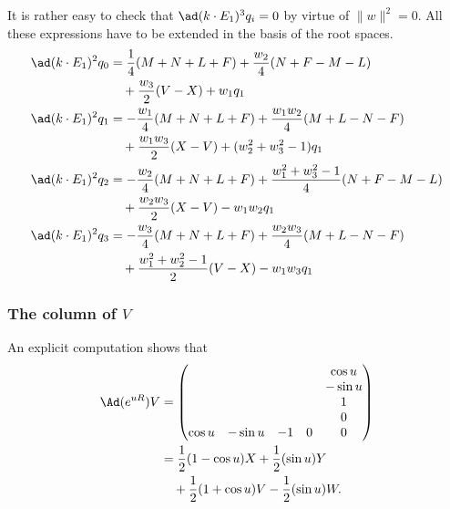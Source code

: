 It is rather easy to check that $\ad(k\cdot E_1)^3q_i=0$ by virtue of $\|w\|^2=0$. All these expressions have to be extended in the basis of the root spaces.
\begin{equation}
	\begin{split}
		\ad(k\cdot E_1)^2q_0 & =\frac{1}{4}(M+N+L+F)+\frac{w_2}{4}(N+F-M-L)              \\
		                     & \quad +\frac{w_3}{2}(V-X)+w_1q_1                          \\
		\ad(k\cdot E_1)^2q_1 & =-\frac{w_1}{4}(M+N+L+F)+ \frac{w_1w_2}{4}(M+L-N-F)       \\
		                     & \quad +\frac{w_1w_3}{2}(X-V) +(w_2^2+w_3^2-1)q_1          \\
		\ad(k\cdot E_1)^2q_2 & =-\frac{w_2}{4}(M+N+L+F)+\frac{w_1^2+w_3^2-1}{4}(N+F-M-L) \\
		                     & \quad +\frac{w_2w_3}{2} (X-V)-w_1w_2q_1                   \\
		\ad(k\cdot E_1)^2q_3 & = -\frac{w_3}{4}(M+N+L+F) +\frac{w_2w_3}{4}(M+L-N-F)      \\
		                     & \quad +\frac{w_1^2+w_2^2-1}{2}(V-X)-w_1w_3q_1
	\end{split}
\end{equation}


\subsubsection{The column of \texorpdfstring{$V$}{V}}

An explicit computation shows that
\begin{equation}
	\begin{split}
		\Ad(e^{uR})V & =
		\begin{pmatrix}
			       &         &    &   & \cos u  \\
			       &         &    &   & -\sin u \\
			       &         &    &   & 1       \\
			       &         &    &   & 0       \\
			\cos u & -\sin u & -1 & 0 & 0
		\end{pmatrix}                                \\
		             & =\frac{1}{2}(1-\cos u)X+\frac{1}{2}(\sin u) Y       \\
		             & \quad+\frac{1}{2}(1+\cos u)V-\frac{1}{2}(\sin u) W.
	\end{split}
\end{equation}

